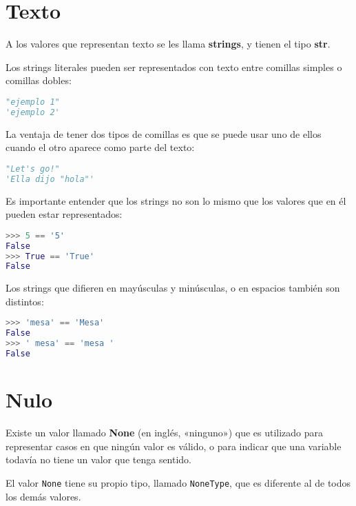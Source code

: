 \section{Texto}

A los valores que representan texto se les llama \textbf{strings}, y
tienen el tipo \textbf{str}.

Los strings literales pueden ser representados con texto entre comillas
simples o comillas dobles:

\begin{lstlisting}[language=py]
"ejemplo 1"
'ejemplo 2'
\end{lstlisting}

La ventaja de tener dos tipos de comillas es que se puede usar uno de
ellos cuando el otro aparece como parte del texto:

\begin{lstlisting}[language=py]
"Let's go!"
'Ella dijo "hola"'
\end{lstlisting}

Es importante entender que los strings no son lo mismo que los valores
que en él pueden estar representados:

\begin{lstlisting}[language=py]
>>> 5 == '5'
False
>>> True == 'True'
False
\end{lstlisting}

Los strings que difieren en mayúsculas y minúsculas, o en espacios
también son distintos:

\begin{lstlisting}[language=py]
>>> 'mesa' == 'Mesa'
False
>>> ' mesa' == 'mesa '
False
\end{lstlisting}

\section{Nulo}

Existe un valor llamado \textbf{None} (en inglés, «ninguno») que es
utilizado para representar casos en que ningún valor es válido, o para
indicar que una variable todavía no tiene un valor que tenga sentido.

El valor \lstinline!None! tiene su propio tipo, llamado
\lstinline!NoneType!, que es diferente al de todos los demás valores.
